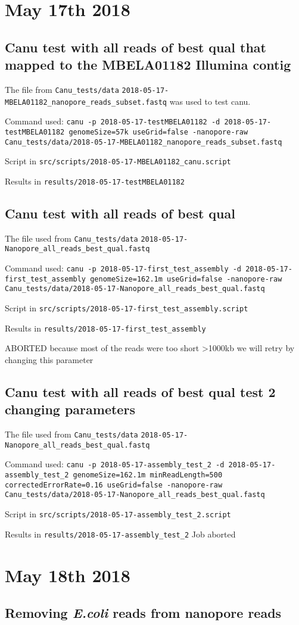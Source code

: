 \documentclass[10pt,a4paper]{article}
\begin{document}
\section{May 17th 2018}

\subsection{Canu test with all reads of best qual that mapped to the MBELA01182 Illumina contig}
The file from \verb!Canu_tests/data!
 \verb!2018-05-17-MBELA01182_nanopore_reads_subset.fastq! was used to test canu.

Command used:
 \verb!canu -p 2018-05-17-testMBELA01182 -d 2018-05-17-testMBELA01182 genomeSize=57k useGrid=false -nanopore-raw Canu_tests/data/2018-05-17-MBELA01182_nanopore_reads_subset.fastq!

Script in  \verb!src/scripts/2018-05-17-MBELA01182_canu.script!

Results in \texttt{results/2018-05-17-testMBELA01182}

\subsection{Canu test with all reads of best qual}
The file used from  \verb!Canu_tests/data!
 \verb!2018-05-17-Nanopore_all_reads_best_qual.fastq!

Command used:
 \verb!canu -p 2018-05-17-first_test_assembly -d 2018-05-17-first_test_assembly genomeSize=162.1m useGrid=false -nanopore-raw Canu_tests/data/2018-05-17-Nanopore_all_reads_best_qual.fastq!

Script in  \verb!src/scripts/2018-05-17-first_test_assembly.script!

Results in  \verb!results/2018-05-17-first_test_assembly!

ABORTED because most of the reads were too short >1000kb we will retry by changing this parameter

\subsection{Canu test with all reads of best qual test 2 changing parameters}
The file used from  \verb!Canu_tests/data!
  \verb!2018-05-17-Nanopore_all_reads_best_qual.fastq!

Command used:
 \verb!canu -p 2018-05-17-assembly_test_2 -d 2018-05-17-assembly_test_2 genomeSize=162.1m minReadLength=500 correctedErrorRate=0.16 useGrid=false -nanopore-raw Canu_tests/data/2018-05-17-Nanopore_all_reads_best_qual.fastq!

Script in  \verb!src/scripts/2018-05-17-assembly_test_2.script!

Results in  \verb!results/2018-05-17-assembly_test_2!
Job aborted

\section{May 18th 2018}

\subsection{Removing \textit{E.coli} reads from nanopore reads}
\end{document}
